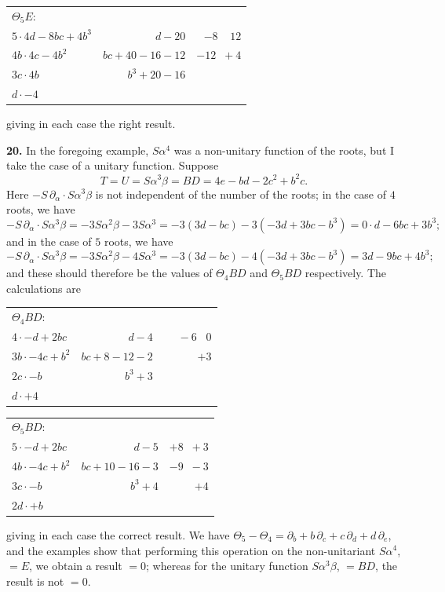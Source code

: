\documentclass[11pt]{article}
\begin{document}
\begin{center}
\begin{tabular}{l@{\quad}r@{\quad}r}
$\Theta_5 E$: & & \\
$5 \cdot 4d - 8bc + 4b^3$ & $d - 20$ & $-8\;\;\;\;12$ \\
$4b \cdot 4c - 4b^2$ & $bc + 40 - 16 - 12$ & $-12\;\;+4$ \\
$3c \cdot 4b$ & $b^3 + 20 - 16$ & \\
$d \cdot -4$ & & \\
\end{tabular}
\end{center}
giving in each case the right result.

\textbf{20.} In the foregoing example, $S\alpha^4$ was a non-unitary function of the roots, but I take the case of a unitary function. Suppose
\[
T = U = S\alpha^3\beta = BD = 4e - bd - 2c^2 + b^2 c.
\]
Here $-S\,\partial_\alpha\cdot S\alpha^3\beta$ is not independent of the number of the roots; in the case of $4$ roots, we have
\[
-S\,\partial_\alpha\cdot S\alpha^3\beta = -3 S\alpha^2\beta - 3 S\alpha^3 = -3(3d - bc) - 3(-3d + 3bc - b^3) = 0\cdot d - 6bc + 3b^3;
\]
and in the case of $5$ roots, we have
\[
-S\,\partial_\alpha\cdot S\alpha^3\beta = -3 S\alpha^2\beta - 4 S\alpha^3 = -3(3d - bc) - 4(-3d + 3bc - b^3) = 3d - 9bc + 4b^3;
\]
and these should therefore be the values of $\Theta_4 BD$ and $\Theta_5 BD$ respectively. The calculations are
\begin{center}
\begin{tabular}{l@{\quad}r@{\quad}r}
$\Theta_4 BD$: & & \\
$4 \cdot -d + 2bc$ & $d - 4$ & $\quad\;-6\;\;\;0$ \\
$3b \cdot -4c + b^2$ & $bc + 8 - 12 - 2$ & $+3$ \\
$2c \cdot -b$ & $b^3 + 3$ & \\
$d \cdot +4$ & & \\
\end{tabular}
\end{center}
\begin{center}
\begin{tabular}{l@{\quad}r@{\quad}r}
$\Theta_5 BD$: & & \\
$5 \cdot -d + 2bc$ & $d - 5$ & $+8\;\;+3$ \\
$4b \cdot -4c + b^2$ & $bc + 10 - 16 - 3$ & $-9\;\;-3$ \\
$3c \cdot -b$ & $b^3 + 4$ & $+4$ \\
$2d \cdot +b$ & & \\
\end{tabular}
\end{center}
giving in each case the correct result. We have $\Theta_5 - \Theta_4 = \partial_b + b\,\partial_c + c\,\partial_d + d\,\partial_e$, and the examples show that performing this operation on the non-unitariant $S\alpha^4$, $= E$, we obtain a result $= 0$; whereas for the unitary function $S\alpha^3\beta$, $= BD$, the result is not $= 0$.
\end{document}
